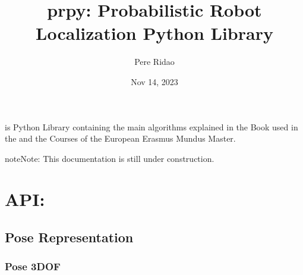 \documentclass[letterpaper,10pt,english]{sphinxmanual}
\title{prpy: Probabilistic Robot Localization Python Library}
\date{Nov 14, 2023}
\author{Pere Ridao}
\begin{document}
\pagestyle{empty}
\sphinxmaketitle
\pagestyle{plain}
\sphinxtableofcontents
\pagestyle{normal}
\label{\detokenize{index::doc}}


\sphinxAtStartPar
{} is Python Library containing the main algorithms explained in the  Book used in the  and the  Courses of the  European Erasmus Mundus Master.

\begin{sphinxadmonition}{note}{Note:}
\sphinxAtStartPar
This documentation is still under construction.
\end{sphinxadmonition}


\chapter{API:}
\label{\detokenize{index:api}}

\section{Pose Representation}
\label{\detokenize{compounding:pose-representation}}\label{\detokenize{compounding::doc}}

\subsection{Pose 3DOF}
\label{\detokenize{compounding:pose-3dof}}
\begin{figure}[htbp]
\centering

\noindent{}
\end{figure}
\end{document}
